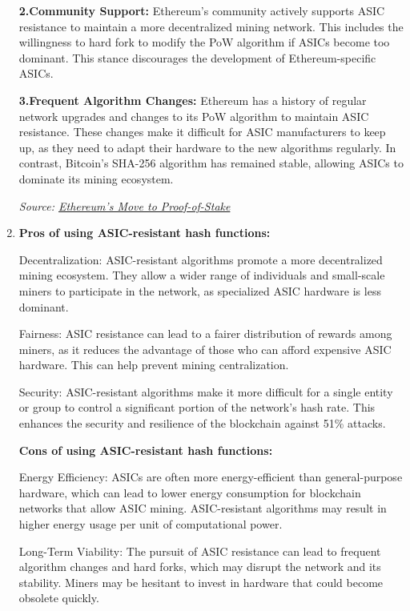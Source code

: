 \documentclass{article}
\begin{document}
\begin{enumerate}
\textbf{2.Community Support:} Ethereum's community actively supports ASIC resistance to maintain a more decentralized mining network. This includes the willingness to hard fork to modify the PoW algorithm if ASICs become too dominant. This stance discourages the development of Ethereum-specific ASICs.

\textbf{3.Frequent Algorithm Changes:} Ethereum has a history of regular network upgrades and changes to its PoW algorithm to maintain ASIC resistance. These changes make it difficult for ASIC manufacturers to keep up, as they need to adapt their hardware to the new algorithms regularly. In contrast, Bitcoin's SHA-256 algorithm has remained stable, allowing ASICs to dominate its mining ecosystem.


\emph{Source: \href{https://blog.ethereum.org/2019/02/28/ethereum-constantinople-st-petersburg-upgrade-announcement/}{Ethereum's Move to Proof-of-Stake}}

\item 

\textbf{Pros of using ASIC-resistant hash functions:}


Decentralization: ASIC-resistant algorithms promote a more decentralized mining ecosystem. They allow a wider range of individuals and small-scale miners to participate in the network, as specialized ASIC hardware is less dominant.

Fairness: ASIC resistance can lead to a fairer distribution of rewards among miners, as it reduces the advantage of those who can afford expensive ASIC hardware. This can help prevent mining centralization.

Security: ASIC-resistant algorithms make it more difficult for a single entity or group to control a significant portion of the network's hash rate. This enhances the security and resilience of the blockchain against 51\% attacks.

\textbf{Cons of using ASIC-resistant hash functions:}


Energy Efficiency: ASICs are often more energy-efficient than general-purpose hardware, which can lead to lower energy consumption for blockchain networks that allow ASIC mining. ASIC-resistant algorithms may result in higher energy usage per unit of computational power.

Long-Term Viability: The pursuit of ASIC resistance can lead to frequent algorithm changes and hard forks, which may disrupt the network and its stability. Miners may be hesitant to invest in hardware that could become obsolete quickly.


\end{enumerate}
\end{document}
